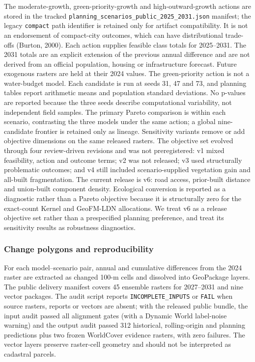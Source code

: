 The moderate-growth, green-priority-growth and high-outward-growth
actions are stored in the tracked
\texttt{planning\_scenarios\_public\_2025\_2031.json} manifest; the
legacy \texttt{compact} path identifier is retained only for artifact
compatibility. It is not an endorsement of compact-city outcomes, which
can have distributional trade-offs (Burton, 2000). Each action supplies
feasible class totals for 2025--2031. The 2031 totals are an explicit
extension of the previous annual difference and are not derived from an
official population, housing or infrastructure forecast. Future
exogenous rasters are held at their 2024 values. The green-priority
action is not a water-budget model. Each candidate is run at seeds 31,
47 and 73, and planning tables report arithmetic means and population
standard deviations. No p-values are reported because the three seeds
describe computational variability, not independent field samples. The
primary Pareto comparison is within each scenario, contrasting the three
models under the same action; a global nine-candidate frontier is
retained only as lineage. Sensitivity variants remove or add objective
dimensions on the same released rasters. The objective set evolved
through four review-driven revisions and was not preregistered: v1 mixed
feasibility, action and outcome terms; v2 was not released; v3 used
structurally problematic outcomes; and v4 still included
scenario-supplied vegetation gain and all-built fragmentation. The
current release is v6: road access, prior-built distance and union-built
component density. Ecological conversion is reported as a diagnostic
rather than a Pareto objective because it is structurally zero for the
exact-count Kernel and GeoFM-LDN allocations. We treat v6 as a release
objective set rather than a prespecified planning preference, and treat
its sensitivity results as robustness diagnostics.

\subsubsection{Change polygons and
reproducibility}\label{change-polygons-and-reproducibility}

For each model--scenario pair, annual and cumulative differences from
the 2024 raster are extracted as changed 100-m cells and dissolved into
GeoPackage layers. The public delivery manifest covers 45 ensemble
rasters for 2027--2031 and nine vector packages. The audit script
reports \texttt{INCOMPLETE\_INPUTS} or \texttt{FAIL} when source
rasters, reports or vectors are absent; with the released public bundle,
the input audit passed all alignment gates (with a Dynamic World
label-noise warning) and the output audit passed 312 historical,
rolling-origin and planning predictions plus two frozen WorldCover
evidence rasters, with zero failures. The vector layers preserve
raster-cell geometry and should not be interpreted as cadastral parcels.

